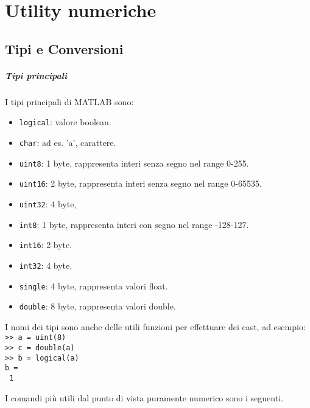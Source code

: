\chapter{Utility numeriche}

\section{Tipi e Conversioni}

\paragraph{Tipi principali}

I tipi principali di MATLAB sono:

\begin{itemize}
    \item	\texttt{logical}: valore boolean.
    \item	\texttt{char}: ad es. 'a', carattere.
    \item	\texttt{uint8}: 1 byte, rappresenta interi senza segno nel range 0-255.
    \item	\texttt{uint16}: 2 byte, rappresenta interi senza segno nel range 0-65535.
    \item	\texttt{uint32}: 4 byte, 
    \item	\texttt{int8}: 1 byte, rappresenta interi con segno nel range -128-127. 
    \item	\texttt{int16}: 2 byte.
    \item	\texttt{int32}: 4 byte.
    \item	\texttt{single}: 4 byte, rappresenta valori float.
    \item	\texttt{double}: 8 byte, rappresenta valori double.
\end{itemize}

I nomi dei tipi sono anche delle utili funzioni per effettuare dei cast, ad esempio:\\
\texttt{>> a = uint(8)} \\
\texttt{>> c = double(a)} \\
\texttt{>> b = logical(a)} \\
\texttt{b = } \\
\texttt{\hspace{0.5cm} 1} \break

I comandi più utili dal punto di vista puramente numerico sono i seguenti.


